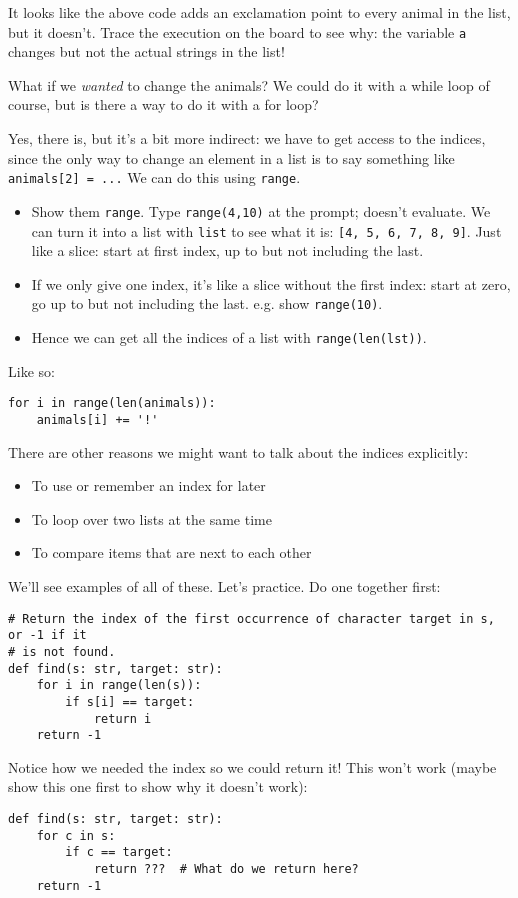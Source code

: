 \documentclass{article}
\begin{document}
It looks like the above code adds an exclamation point to every animal
in the list, but it doesn't.  Trace the execution on the board to see
why: the variable \verb|a| changes but not the actual strings in the list!

What if we \emph{wanted} to change the animals?  We could do it with a
while loop of course, but is there a way to do it with a for loop?

Yes, there is, but it's a bit more indirect: we have to get access to
the indices, since the only way to change an element in a list is to
say something like \verb|animals[2] = ...| We can do this using
\verb|range|.

\begin{itemize}
\item Show them \verb|range|.  Type \verb|range(4,10)| at the prompt;
  doesn't evaluate.  We can turn it into a list with \verb|list| to
  see what it is: \verb|[4, 5, 6, 7, 8, 9]|.  Just like a slice: start
  at first index, up to but not including the last.
\item If we only give one index, it's like a slice without the first
  index: start at zero, go up to but not including the last.
  e.g. show \verb|range(10)|.
\item Hence we can get all the indices of a list with
  \verb|range(len(lst))|.
\end{itemize}

Like so:
\begin{verbatim}
for i in range(len(animals)):
    animals[i] += '!'
\end{verbatim}

There are other reasons we might want to talk about the indices
explicitly:
\begin{itemize}
\item To use or remember an index for later
\item To loop over two lists at the same time
\item To compare items that are next to each other
\end{itemize}

We'll see examples of all of these.  Let's practice.  Do one together first:
\begin{verbatim}
# Return the index of the first occurrence of character target in s, or -1 if it
# is not found.
def find(s: str, target: str):
    for i in range(len(s)):
        if s[i] == target:
            return i
    return -1
\end{verbatim}
Notice how we needed the index so we could return it!  This won't
work (maybe show this one first to show why it doesn't work):
\begin{verbatim}
def find(s: str, target: str):
    for c in s:
        if c == target:
            return ???  # What do we return here?
    return -1
\end{verbatim}
\end{document}
